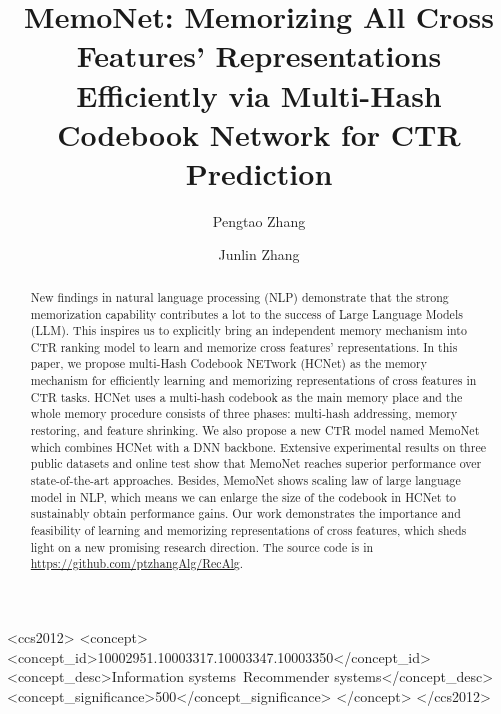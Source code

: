\documentclass[sigconf,authorversion]{acmart}
\begin{document}
\title{MemoNet: Memorizing All Cross Features' Representations Efficiently via Multi-Hash Codebook Network for CTR Prediction}
\renewcommand{\shorttitle}{MemoNet: Memorizing All Cross Features' Representations Efficiently via Multi-Hash Codebook Network\\for CTR Prediction}

\author{Pengtao Zhang}

\author{Junlin Zhang}


\renewcommand{\shortauthors}{Pengtao Zhang and Junlin Zhang}

\begin{abstract}
 New findings in natural language processing (NLP) demonstrate that the strong memorization capability contributes a lot to the success of Large Language Models (LLM). This inspires us to  explicitly bring an independent memory mechanism into CTR ranking model to learn and memorize cross features' representations. In this paper, we propose multi-Hash Codebook NETwork (HCNet) as the memory mechanism for efficiently learning and memorizing representations of cross features in CTR tasks. HCNet uses a multi-hash codebook as the main memory place and the whole memory procedure consists of three phases: multi-hash addressing, memory restoring, and feature shrinking. We also propose a new CTR model named MemoNet which combines HCNet with a DNN backbone. Extensive experimental results on three public datasets and online test show that MemoNet reaches superior performance over state-of-the-art approaches. Besides, MemoNet shows scaling law of large language model in NLP, which means we can enlarge the size of the codebook in HCNet to sustainably obtain performance gains. Our work demonstrates the importance and feasibility of learning and memorizing representations of cross features, which sheds light on a new promising research direction. The source code is in \url{https://github.com/ptzhangAlg/RecAlg}.
  
\end{abstract}

\begin{CCSXML}
<ccs2012>
 <concept>
    <concept_id>10002951.10003317.10003347.10003350</concept_id>
    <concept_desc>Information systems~Recommender systems</concept_desc>
    <concept_significance>500</concept_significance>
 </concept>
</ccs2012>
\end{CCSXML}
\end{document}
